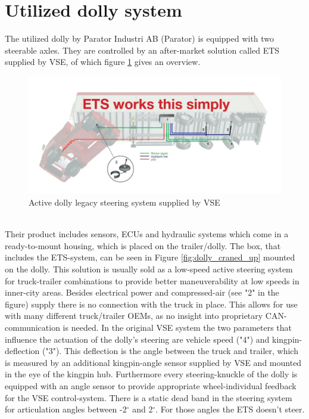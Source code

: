 \documentclass[ExampleMasters.tex]{subfiles}
\begin{document}
\section{Utilized dolly system}
\label{sec:dolly_system}
The utilized dolly by Parator Industri AB (Parator) is equipped with two steerable axles. They are controlled by an after-market solution called \gls{ETS} supplied by \gls{VSE}, of which figure \ref{fig:legacy_system_vse} gives an overview.
\begin{figure}[!htb]
	\centering
	\includegraphics[width=1.0\linewidth]{figures/legacy_system_vse}
	\caption[Active dolly legacy steering system supplied by VSE]{Active dolly legacy steering system supplied by VSE \cite{dolly_datasheet}}
	\label{fig:legacy_system_vse}
\end{figure} \\
 Their product includes sensors, \gls{ECU}s and hydraulic systems which come in a ready-to-mount housing, which is placed on the trailer/dolly. The box, that includes the \gls{ETS}-system, can be seen in Figure \ref{fig:dolly_craned_up} mounted on the dolly. This solution is usually sold as a low-speed active steering system for truck-trailer combinations to provide better maneuverability at low speeds in inner-city areas. Besides electrical power and compressed-air (see "2" in the figure) supply there is no connection with the truck in place. This allows for use with many different truck/trailer \gls{OEM}s, as no insight into proprietary \gls{CAN}-communication is needed. In the original \gls{VSE} system the two parameters that influence the actuation of the dolly's steering are vehicle speed ("4") and kingpin-deflection ("3"). This deflection is the angle between the truck and trailer, which is measured by an additional kingpin-angle sensor supplied by \gls{VSE} and mounted in the eye of the kingpin hub. Furthermore every steering-knuckle of the dolly is equipped with an angle sensor to provide appropriate wheel-individual feedback for the \gls{VSE} control-system. There is a static dead band in the steering system for articulation angles between -2$^\circ$ and 2$^\circ$. For those angles the \gls{ETS} doesn't steer.
   
\end{document}

